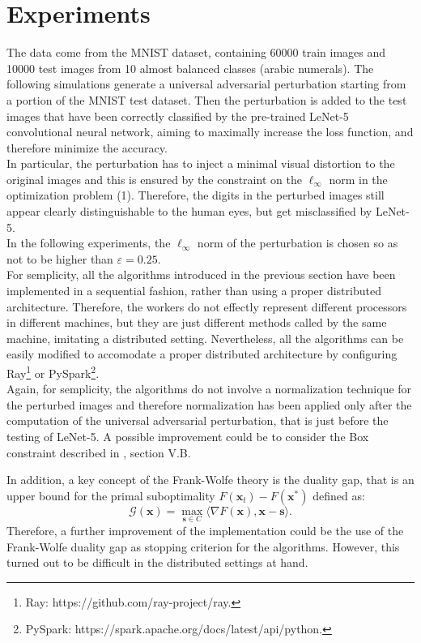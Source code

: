\section{Experiments}
The data come from the MNIST dataset, containing 60000 train images and 10000 test images from 10 almost balanced classes (arabic numerals). The following simulations generate a universal adversarial perturbation starting from a portion of the MNIST test dataset. Then the perturbation is added to the test images that have been correctly classified by the pre-trained LeNet-5 convolutional neural network, aiming to maximally increase the loss function, and therefore minimize the accuracy.\\
\indent In particular, the perturbation has to inject a minimal visual distortion to the original images and this is ensured by the constraint on the $\ell_{\infty}$ norm in the optimization problem (1). Therefore, the digits in the perturbed images still appear clearly distinguishable to the human eyes, but get misclassified by LeNet-5.\\
\indent 
In the following experiments, the $\ell_{\infty}$ norm of the perturbation is chosen so as not to be higher than $\varepsilon=0.25$.\\

For semplicity, all the algorithms introduced in the previous section have been implemented in a sequential fashion, rather than using a proper distributed architecture. Therefore, the workers do not effectly represent different processors in different machines, but they are just different methods called by the same machine, imitating a distributed setting. Nevertheless, all the algorithms can be easily modified to accomodate a proper distributed architecture by configuring Ray\footnote{Ray: https://github.com/ray-project/ray.} or PySpark\footnote{PySpark: https://spark.apache.org/docs/latest/api/python.}.\\

Again, for semplicity, the algorithms do not involve a normalization technique for the perturbed images and therefore normalization has been applied only after the computation of the universal adversarial perturbation, that is just before the testing of LeNet-5. A possible improvement could be to consider the Box constraint described in \cite{A1}, section V.B.\indent

In addition, a key concept of the Frank-Wolfe theory is the duality gap, that is an upper bound for the primal suboptimality $F(\mathbf{x}_t)-F(\mathbf{x}^*)$ defined as:
\begin{equation}
	\mathcal{G}(\mathbf{x}) =\max_{\mathbf{s}\in\mathit{C}} \langle \nabla F(\mathbf{x}),\mathbf{x}-\mathbf{s}\rangle.
\end{equation}
Therefore, a further improvement of the implementation could be the use of the Frank-Wolfe duality gap as stopping criterion for the algorithms. However, this turned out to be difficult in the distributed settings at hand.
